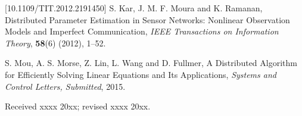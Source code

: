 \documentclass{aims}
\begin{document}
\begin{thebibliography}{99}
 [10.1109/TIT.2012.2191450]
    \newblock S. Kar, J. M. F. Moura and K. Ramanan, \newblock Distributed Parameter Estimation in Sensor Networks: Nonlinear Observation Models and Imperfect Communication,
    \newblock \emph{IEEE Transactions on Information Theory}, \textbf{58}(6) (2012), 1--52.

    \newblock S. Mou, A. S. Morse, Z. Lin, L. Wang and D. Fullmer, \newblock A Distributed Algorithm for Efficiently Solving Linear Equations and Its Applications,
    \newblock \emph{Systems and Control Letters, Submitted}, 2015.


\end{thebibliography}

\medskip
Received xxxx 20xx; revised xxxx 20xx.
\medskip
\end{document}
